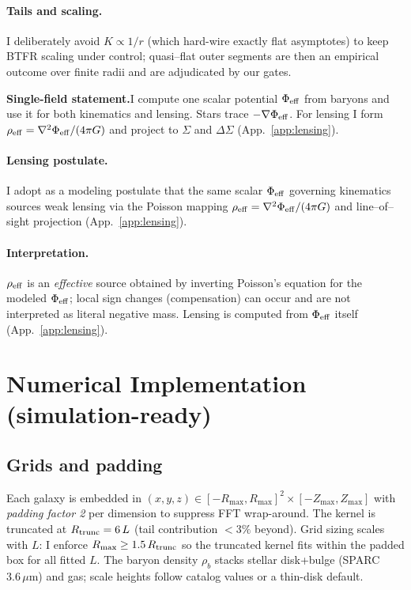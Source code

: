 \documentclass[11pt,a4paper]{article}
\newcommand{\Lmem}{L}       %
\newcommand{\rhob}{\rho_b}  %
\newcommand{\keybox}[1]{%
  \vspace{0.6em}\noindent
  \colorbox{gray!10}{\parbox{\dimexpr\linewidth-2\fboxsep\relax}{#1}}%
  \vspace{0.6em}
}
\begin{document}
\paragraph{Tails and scaling.}
I deliberately avoid $K\propto 1/r$ (which hard-wire exactly flat asymptotes) to keep BTFR scaling under control; quasi–flat outer segments are then an empirical outcome over finite radii and are adjudicated by our gates.

\keybox{\textbf{Single-field statement.}\;\;I compute one scalar potential $\Phi_{\rm eff}$ from baryons and use it for both kinematics and lensing. Stars trace $-\nabla\Phi_{\rm eff}$. For lensing I form $\rho_{\rm eff}=\nabla^2\Phi_{\rm eff}/(4\pi G)$ and project to $\Sigma$ and $\Delta\Sigma$ (App.~\ref{app:lensing}).}

\paragraph{Lensing postulate.}
I adopt as a modeling postulate that the same scalar $\Phi_{\rm eff}$ governing kinematics sources weak lensing via the Poisson mapping $\rho_{\rm eff}=\nabla^2\Phi_{\rm eff}/(4\pi G)$ and line–of–sight projection (App.~\ref{app:lensing}).

\paragraph{Interpretation.} $\rho_{\rm eff}$ is an \emph{effective} source obtained by inverting Poisson’s equation for the modeled $\Phi_{\rm eff}$; local sign changes (compensation) can occur and are not interpreted as literal negative mass. Lensing is computed from $\Phi_{\rm eff}$ itself (App.~\ref{app:lensing}).

\section{Numerical Implementation (simulation-ready)}\label{sec:numerics}
\subsection{Grids and padding}\label{subsec:grids}
Each galaxy is embedded in $(x,y,z)\in[-R_{\max},R_{\max}]^2\times[-Z_{\max},Z_{\max}]$ with \emph{padding factor 2} per dimension to suppress FFT wrap-around. The kernel is truncated at $R_{\rm trunc}=6\,\Lmem$ (tail contribution $<3\%$ beyond). Grid sizing scales with $\Lmem$: I enforce $R_{\max}\ge 1.5\,R_{\rm trunc}$ so the truncated kernel fits within the padded box for all fitted $L$. The baryon density $\rhob$ stacks stellar disk+bulge (SPARC $3.6\,\mu$m) and gas; scale heights follow catalog values or a thin-disk default.
\end{document}
